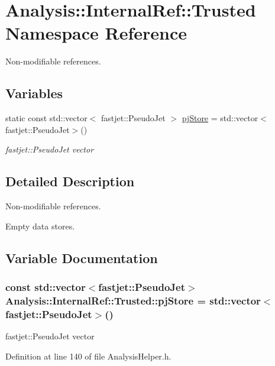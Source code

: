 \hypertarget{namespaceAnalysis_1_1InternalRef_1_1Trusted}{}\section{Analysis\+:\+:Internal\+Ref\+:\+:Trusted Namespace Reference}
\label{namespaceAnalysis_1_1InternalRef_1_1Trusted}


Non-\/modifiable references.  


\subsection*{Variables}
\begin{DoxyCompactItemize}
\item 
static const std\+::vector$<$ fastjet\+::\+Pseudo\+Jet $>$ \hyperlink{namespaceAnalysis_1_1InternalRef_1_1Trusted_ae5f4c662b47b5cb2b0158ccd22583a20}{pj\+Store} = std\+::vector$<$fastjet\+::\+Pseudo\+Jet$>$()
\begin{DoxyCompactList}\small\item\em {\ttfamily fastjet\+::\+Pseudo\+Jet} vector \end{DoxyCompactList}\end{DoxyCompactItemize}


\subsection{Detailed Description}
Non-\/modifiable references. 

Empty data stores. 

\subsection{Variable Documentation}
\subsubsection[{\texorpdfstring{pj\+Store}{pjStore}}]{\setlength{\rightskip}{0pt plus 5cm}const std\+::vector$<$fastjet\+::\+Pseudo\+Jet$>$ Analysis\+::\+Internal\+Ref\+::\+Trusted\+::pj\+Store = std\+::vector$<$fastjet\+::\+Pseudo\+Jet$>$()\hspace{0.3cm}{\ttfamily [static]}}\hypertarget{namespaceAnalysis_1_1InternalRef_1_1Trusted_ae5f4c662b47b5cb2b0158ccd22583a20}{}\label{namespaceAnalysis_1_1InternalRef_1_1Trusted_ae5f4c662b47b5cb2b0158ccd22583a20}


{\ttfamily fastjet\+::\+Pseudo\+Jet} vector 



Definition at line 140 of file Analysis\+Helper.\+h.

